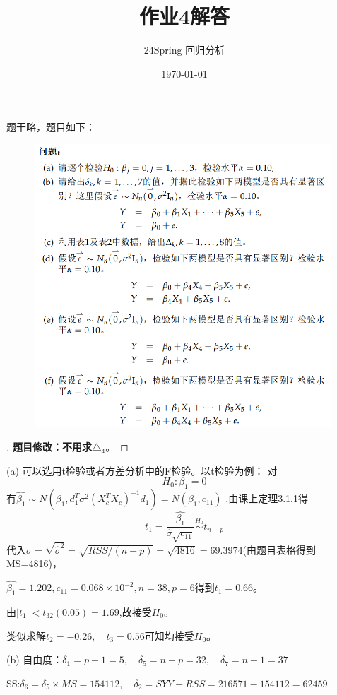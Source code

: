 \documentclass[cn,hazy,green,12pt,normal]{elegantnote}
\title{作业4解答}
\author{24Spring 回归分析}
\date{\today}
\numberwithin{equation}{section}
\numberwithin{subsection}{section}
\begin{document}
\maketitle

\begin{homework}   
\end{homework}
题干略，题目如下：
    \begin{figure}[!htbp]
        \centering
        \includegraphics[width=30em]{image/hw4_plt1.png}
    \end{figure}

\begin{proof}[\solutionname]
    \textbf{题目修改：不用求}$\triangle_4$。
\end{proof}
(a) 可以选用t检验或者方差分析中的F检验。以t检验为例：
对\[H_0: \beta_1 = 0\]
有$\hat{\beta_1} \sim N(\beta_1, d_1^T\sigma^2(X_c^TX_c)^{-1}d_1)=N(\beta_1, c_{11})$
,由课上定理3.1.1得
\[t_1 = \dfrac{\hat{\beta_1}}{\hat{\sigma}\sqrt{c_{11}}}\overset{H_0}{\sim} t_{n-p}\]
代入$\hat{\sigma}= \sqrt{\hat{\sigma}^2} = \sqrt{RSS/(n-p)}=\sqrt{4816}=69.3974$(由题目表格得到MS=4816)，

$\hat{\beta_1}=1.202,c_{11}=0.068\times10^{-2},n= 38,p=6$得到$t_1=0.66$。

由$|t_1|<t_{32}(0.05)=1.69$,故接受$H_0$。

类似求解$t_2=-0.26,\quad t_3 = 0.56$可知均接受$H_0$。

\noindent (b) 自由度：$\delta_1 = p-1=5, \quad \delta_5=n-p=32, \quad \delta_7=n-1=37$

SS:$\delta_6 = \delta_5\times MS=154112,\quad \delta_2=SYY-RSS=216571-154112=62459$
\end{document}
